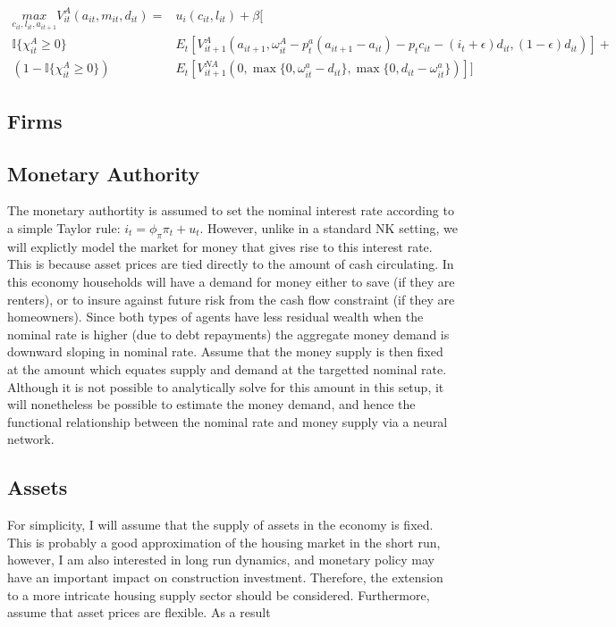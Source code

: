 \documentclass{article}
\begin{document}
\begin{align}
  \underset{c_{it}, l_{it}, a_{it+1}}{max} V^{A}_{it}(a_{it}, m_{it}, d_{it}) = &u_{i}(c_{it}, l_{it}) + \beta [  \nonumber \\ 
  \mathbb{I}\{ \chi^A_{it} \geq 0 \} &E_t[V^A_{it+1}(a_{it+1}, \omega^A_{it} - p^a_t (a_{it+1} - a_{it}) - p_t c_{it} - (i_t +\epsilon) d_{it}, (1 - \epsilon) d_{it})] + \nonumber \\ 
  \left(1 - \mathbb{I}\{ \chi^A_{it} \geq 0 \} \right) &E_t[V^{NA}_{it+1}(0, \max \{ 0, \omega^a_{it} - d_{it} \}, \max \{ 0, d_{it} - \omega^a_{it} \})]] \label{va}
\end{align}

\subsection{Firms}

\subsection{Monetary Authority}

The monetary authortity is assumed to set the nominal interest rate according to a simple Taylor rule: $i_t = \phi_\pi \pi_t + u_t$. However, unlike in a standard NK setting, we will explictly model the market for money that gives rise to this interest rate. This is because asset prices are tied directly to the amount of cash circulating. In this economy households will have a demand for money either to save (if they are renters), or to insure against future risk from the cash flow constraint (if they are homeowners). Since both types of agents have less residual wealth when the nominal rate is higher (due to debt repayments) the aggregate money demand is downward sloping in nominal rate. Assume that the money supply is then fixed at the amount which equates supply and demand at the targetted nominal rate. Although it is not possible to analytically solve for this amount in this setup, it will nonetheless be possible to estimate the money demand, and hence the functional relationship between the nominal rate and money supply via a neural network.

\subsection{Assets}

For simplicity, I will assume that the supply of assets in the economy is fixed. This is probably a good approximation of the housing market in the short run, however, I am also interested in long run dynamics, and monetary policy may have an important impact on construction investment. Therefore, the extension to a more intricate housing supply sector should be considered. Furthermore, assume that asset prices are flexible. As a result  
\end{document}
